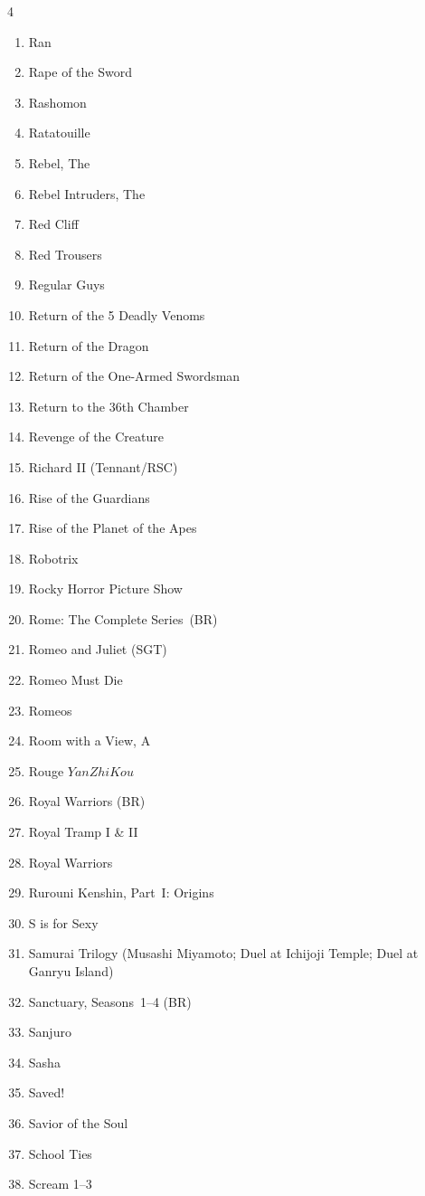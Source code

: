 \documentclass{article}
\begin{document}
\begin{multicols}{4}
\begin{enumerate}
\item Ran
\item Rape of the Sword
\item Rashomon
\item Ratatouille
\item Rebel, The
\item Rebel Intruders, The
\item Red Cliff
\item Red Trousers
\item Regular Guys
\item Return of the 5 Deadly Venoms
\item Return of the Dragon
\item Return of the One-Armed Swordsman
\item Return to the 36th Chamber
\item Revenge of the Creature
\item Richard II (Tennant/RSC)
\item Rise of the Guardians
\item Rise of the Planet of the Apes
\item Robotrix
\item Rocky Horror Picture Show
\item Rome: The Complete Series~(BR)
\item Romeo and Juliet (SGT)
\item Romeo Must Die
\item Romeos
\item Room with a View, A
\item Rouge \(Yan Zhi Kou\)
\item Royal Warriors (BR)
\item Royal Tramp I \& II
\item Royal Warriors
\item Rurouni Kenshin, Part~I: Origins
\item S is for Sexy
\item Samurai Trilogy (Musashi Miyamoto; Duel at Ichijoji Temple; Duel
  at Ganryu Island)
\item Sanctuary, Seasons~1--4 (BR)
\item Sanjuro
\item Sasha
\item Saved!
\item Savior of the Soul
\item School Ties
\item Scream 1--3

\end{enumerate}
\end{multicols}
\end{document}

